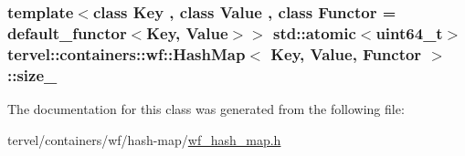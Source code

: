 \subsubsection[{size\+\_\+}]{\setlength{\rightskip}{0pt plus 5cm}template$<$class Key , class Value , class Functor  = default\+\_\+functor$<$\+Key, Value$>$$>$ std\+::atomic$<$uint64\+\_\+t$>$ {\bf tervel\+::containers\+::wf\+::\+Hash\+Map}$<$ Key, {\bf Value}, Functor $>$\+::size\+\_\+\hspace{0.3cm}{\ttfamily [private]}}\label{classtervel_1_1containers_1_1wf_1_1_hash_map_a88bcdcb8728735910311f62e99027385}


The documentation for this class was generated from the following file\+:\begin{DoxyCompactItemize}
\item 
tervel/containers/wf/hash-\/map/\hyperlink{wf__hash__map_8h}{wf\+\_\+hash\+\_\+map.\+h}\end{DoxyCompactItemize}
